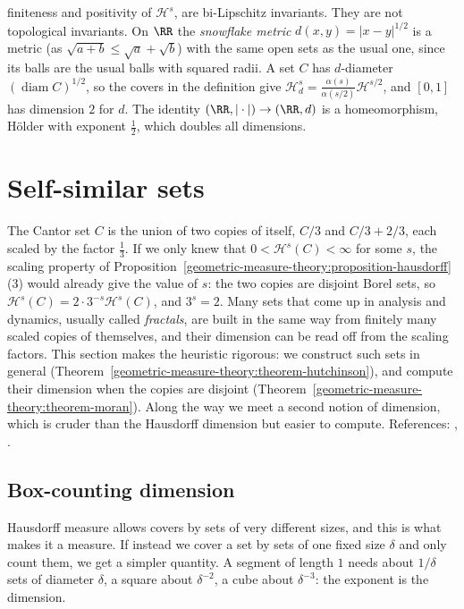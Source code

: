 \begin{example}
\begin{enumerate}
finiteness and positivity of $\mathcal{H}^s$, are bi-Lipschitz invariants. They are not topological invariants. On $\RR$ the \emph{snowflake metric} $d(x, y) = |x - y|^{1/2}$ is a metric (as
$\sqrt{a + b} \leq \sqrt a + \sqrt b$) with the same open sets as the usual one, since its balls are the usual balls with squared radii. A set $C$ has $d$-diameter $(\operatorname{diam}C)^{1/2}$, so the covers in the
definition give $\mathcal{H}^s_d = \frac{\alpha(s)}{\alpha(s/2)}\mathcal{H}^{s/2}$, and $[0, 1]$ has dimension $2$ for $d$. The identity $(\RR, |\cdot|) \to (\RR, d)$ is a homeomorphism, H\"older with
exponent $\frac12$, which doubles all dimensions.
\end{enumerate}
\end{example}

\section{Self-similar sets}\label{geometric-measure-theory:section-self-similar}

The Cantor set $C$ is the union of two copies of itself, $C/3$ and $C/3 + 2/3$, each scaled by the factor $\frac13$. If we only knew that $0 < \mathcal{H}^s(C) < \infty$ for some $s$, the scaling property
of Proposition~\ref{geometric-measure-theory:proposition-hausdorff}(3) would already give the value of $s$: the two copies are disjoint Borel sets, so
$\mathcal{H}^s(C) = 2 \cdot 3^{-s}\mathcal{H}^s(C)$, and $3^s = 2$. Many sets that come up in analysis and dynamics, usually called \emph{fractals}, are built in the same way from finitely many
scaled copies of themselves, and their dimension can be read off from the scaling factors. This section makes the heuristic rigorous: we construct such sets in general
(Theorem~\ref{geometric-measure-theory:theorem-hutchinson}), and compute their dimension when the copies are disjoint (Theorem~\ref{geometric-measure-theory:theorem-moran}). Along the way we meet a second notion of
dimension, which is cruder than the Hausdorff dimension but easier to compute. References: \cite{falconer-fractal}, \cite{hutchinson-1981}.

\subsection{Box-counting dimension}\label{geometric-measure-theory:subsection-box-dimension}

Hausdorff measure allows covers by sets of very different sizes, and this is what makes it a measure. If instead we cover a set by sets of one fixed size $\delta$ and only count them, we get a
simpler quantity. A segment of length $1$ needs about $1/\delta$ sets of diameter $\delta$, a square about $\delta^{-2}$, a cube about $\delta^{-3}$: the exponent is the dimension.

